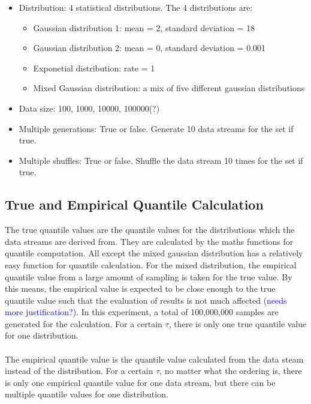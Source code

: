 \documentclass[12pt]{article}
\begin{document}
\begin{itemize}
    \item Distribution: 4 statistical distributions. The 4 distributions are:
        \begin{itemize}
            \item Gaussian distribution 1: mean = 2, standard deviation = 18
            \item Gaussian distribution 2: mean = 0, standard deviation = 0.001
            \item Exponetial distribution: rate = 1
            \item Mixed Gaussian distribution: a mix of five different gaussian distributions
        \end{itemize}
    \item Data size: 100, 1000, 10000, 100000(?)
    \item Multiple generations: True or false. Generate 10 data streams for the set if true.
    \item Multiple shuffles:  True or false. Shuffle the data stream 10 times for the set if true.
\end{itemize}

\subsection{True and Empirical Quantile Calculation}
The true quantile values are the quantile values for the distributions which the data streams are derived from. They are calculated by the maths functions for quantile computation. All except the mixed gaussian distribution has a relatively easy function for quantile calculation. For the mixed distribution, the empirical quantile value from a large amount of sampling is taken for the true value. By this means, the empirical value is expected to be close enough to the true quantile value such that the evaluation of results is not much affected \textcolor{blue}{(needs more justification?)}. In this experiment, a total of 100,000,000 samples are generated for the calculation. For a certain $\tau$, there is only one true quantile value for one distribution.
\\\\
The empirical quantile value is the quantile value calculated from the data steam instead of the distribution. For a certain $\tau$, no matter what the ordering is, there is only one empirical quantile value for one data stream, but there can be multiple quantile values for one distribution.
\end{document}
